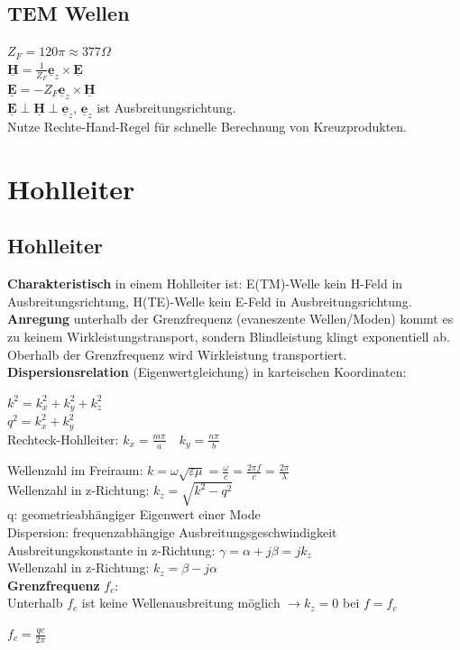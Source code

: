 \documentclass[english]{latex4ei/latex4ei_sheet}
\renewcommand{\vec}[1]{\underline{\boldsymbol{#1}}}
\begin{document}
\begin{sectionbox}
	\subsection{TEM Wellen}
	$Z_F = 120\pi \approx 377 \Omega$\\
	$\vec{H} = \frac{1}{Z_F} \vec{e}_z \times \vec{E}$\\
	$\vec{E} = -Z_F \vec{e}_z \times \vec{H}$\\
	$\vec{E} \perp \vec{H} \perp \vec{e}_z$, $\vec{e}_z$ ist Ausbreitungsrichtung.\\
	Nutze Rechte-Hand-Regel für schnelle Berechnung von Kreuzprodukten.
\end{sectionbox}

\section{Hohlleiter}
\begin{sectionbox}
	\subsection{Hohlleiter}
	\textbf{Charakteristisch} in einem Hohlleiter ist:
	E(TM)-Welle kein H-Feld in Ausbreitungsrichtung, H(TE)-Welle kein E-Feld in Ausbreitungsrichtung.\\
	\textbf{Anregung} unterhalb der Grenzfrequenz (evaneszente Wellen/Moden) kommt es zu keinem Wirkleistungstransport, sondern Blindleistung klingt exponentiell ab.
	Oberhalb der Grenzfrequenz wird Wirkleistung transportiert.\\
	\textbf{Dispersionsrelation} (Eigenwertgleichung) in karteischen Koordinaten:
	\begin{emphbox}
		$k^{2}=k_{x}^{2}+k_{y}^{2}+k_{z}^{2}$\\
		$q^2 = k_{x}^{2}+k_{y}^{2}$\\
		Rechteck-Hohlleiter: $k_x = \frac{m\pi}{a}\quad k_y = \frac{n \pi}{b}$
	\end{emphbox}
	Wellenzahl im Freiraum: $k = \omega\sqrt{\varepsilon \mu} = \frac{\omega}{c} = \frac{2\pi f}{c} = \frac{2\pi}{\lambda}$\\
	Wellenzahl in z-Richtung: $k_z = \sqrt{k^2 - q^2}$\\
	q: geometrieabhängiger Eigenwert einer Mode\\
	Dispersion: frequenzabhängige Ausbreitungsgeschwindigkeit\\

	Ausbreitungskonstante in z-Richtung: $\gamma = \alpha + j\beta = jk_z$\\
	Wellenzahl in z-Richtung: $ k_z = \beta - j \alpha$\\

	\textbf{Grenzfrequenz} $f_c$:\\
	Unterhalb $f_c$ ist keine Wellenausbreitung möglich $\rightarrow k_z = 0$ bei $f = f_c$ 
	\begin{emphbox}
		$f_c = \frac{qc}{2\pi}$
	\end{emphbox}	
\end{sectionbox}
\end{document}
